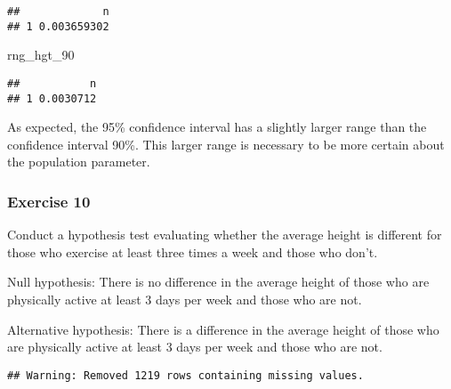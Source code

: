 \documentclass[
]{article}
\newenvironment{Shaded}{\begin{snugshade}}{\end{snugshade}}
\newcommand{\DataTypeTok}[1]{\textcolor[rgb]{0.13,0.29,0.53}{#1}}
\newcommand{\DecValTok}[1]{\textcolor[rgb]{0.00,0.00,0.81}{#1}}
\newcommand{\KeywordTok}[1]{\textcolor[rgb]{0.13,0.29,0.53}{\textbf{#1}}}
\newcommand{\NormalTok}[1]{#1}
\newcommand{\OperatorTok}[1]{\textcolor[rgb]{0.81,0.36,0.00}{\textbf{#1}}}
\newcommand{\StringTok}[1]{\textcolor[rgb]{0.31,0.60,0.02}{#1}}
\begin{document}
\begin{verbatim}
##             n
## 1 0.003659302
\end{verbatim}

\begin{Shaded}
\begin{Highlighting}[]
\NormalTok{rng_hgt_}\DecValTok{90}
\end{Highlighting}
\end{Shaded}

\begin{verbatim}
##           n
## 1 0.0030712
\end{verbatim}

As expected, the 95\% confidence interval has a slightly larger range
than the confidence interval 90\%. This larger range is necessary to be
more certain about the population parameter.

\hypertarget{exercise-10}{%
\subsubsection{Exercise 10}\label{exercise-10}}

Conduct a hypothesis test evaluating whether the average height is
different for those who exercise at least three times a week and those
who don't.

Null hypothesis: There is no difference in the average height of those
who are physically active at least 3 days per week and those who are
not.

Alternative hypothesis: There is a difference in the average height of
those who are physically active at least 3 days per week and those who
are not.

\begin{Shaded}
\end{Shaded}

\begin{verbatim}
## Warning: Removed 1219 rows containing missing values.
\end{verbatim}
\end{document}
